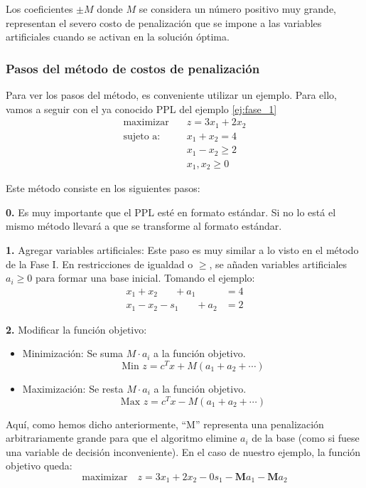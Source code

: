 Los coeficientes \(\pm M\) donde \(M\) se considera un número positivo muy grande, representan el severo costo de penalización que se impone a las variables artificiales cuando se activan en la solución óptima. 

\subsubsection{Pasos del método de costos de penalización}

Para ver los pasos del método, es conveniente utilizar un ejemplo. Para ello, vamos a seguir con el ya conocido PPL del ejemplo \ref{ej:fase_1}
\begin{align*}
  \text{maximizar} \quad  &z = 3x_1 + 2x_2\\[3pt]
  \text{sujeto a:} \quad  &x_1 + x_2 = 4\\
                          &x_1 - x_2 \geq 2\\
                          &x_1, x_2 \geq 0
\end{align*}

Este método consiste en los siguientes pasos:

\noindent\textbf{0.} Es muy importante que el PPL esté en formato estándar. Si no lo está el mismo método llevará a que se transforme al formato estándar.

\noindent\textbf{1.} Agregar variables artificiales: Este paso es muy similar a lo visto en el método de la Fase I. En restricciones de igualdad o \(\geq\), se añaden variables artificiales \(a_i \geq 0\) para formar una base inicial. Tomando el ejemplo:
\begin{align*}
  x_1 + x_2 \phantom{ - s_1 } + a_1 \phantom{ + a_2 } &= 4 \\
  x_1 - x_2 - s_1 \phantom{ + a_1 } + a_2 &= 2
\end{align*}

\noindent\textbf{2.} Modificar la función objetivo:
\begin{itemize}
  \item Minimización: Se suma \(M \cdot a_i\) a la función objetivo.  
  \[
    \text{Min } z = c^T x + M(a_1 + a_2 + \cdots)
  \]
  \item Maximización: Se resta \(M \cdot a_i\) a la función objetivo.  
  \[
    \text{Max } z = c^T x - M(a_1 + a_2 + \cdots)
  \]
\end{itemize}  
Aquí, como hemos dicho anteriormente, ``M'' representa una penalización arbitrariamente grande para que el algoritmo elimine \(a_i\) de la base (como si fuese una variable de decisión inconveniente). En el caso de nuestro ejemplo, la función objetivo queda:
\[
  \text{maximizar} \quad z = 3x_1 + 2x_2 - 0s_1 - \mathbf{M}a_1 - \mathbf{M}a_2
\]

